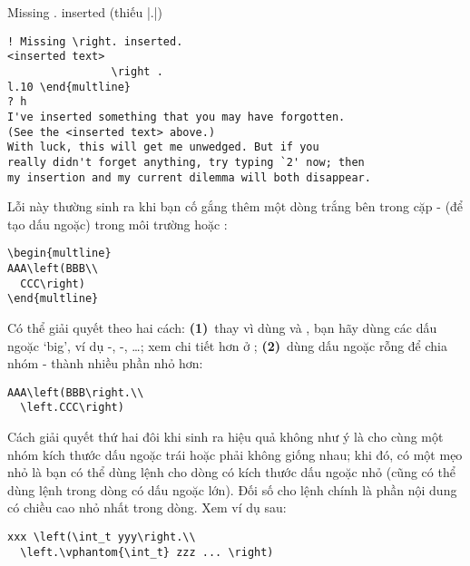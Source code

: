 \begin{error}{Missing \right. inserted}
(thiếu |\right.|)
\errexa
\begin{verbatim}
! Missing \right. inserted.
<inserted text>
                \right .
l.10 \end{multline}
? h
I've inserted something that you may have forgotten.
(See the <inserted text> above.)
With luck, this will get me unwedged. But if you
really didn't forget anything, try typing `2' now; then
my insertion and my current dilemma will both disappear.
\end{verbatim}
\errexpl
Lỗi này thường sinh ra khi bạn cố gắng thêm một dòng trắng bên trong
cặp - (để tạo dấu ngoặc) trong môi trường 
hoặc :
\begin{verbatim}
\begin{multline}
AAA\left(BBB\\
  CCC\right)
\end{multline}
\end{verbatim}
Có thể giải quyết theo hai cách: \textbf{(1)}~thay vì dùng  và ,
bạn hãy dùng các dấu ngoặc `big', ví dụ -,
-, \dots; xem chi tiết hơn ở ;
\textbf{(2)}~dùng dấu ngoặc rỗng để chia nhóm - thành
nhiều phần nhỏ hơn:
\begin{verbatim}
AAA\left(BBB\right.\\
  \left.CCC\right)
\end{verbatim}
Cách giải quyết thứ hai đôi khi sinh ra hiệu quả không như ý là cho cùng
một nhóm kích thước dấu ngoặc trái hoặc phải không giống nhau;
khi đó, có một  mẹo nhỏ là bạn có thể dùng lệnh  cho dòng
có kích thước dấu ngoặc nhỏ (cũng có thể dùng lệnh 
trong dòng có dấu  ngoặc lớn). Đối số cho lệnh  chính là
phần nội dung có chiều cao nhỏ nhất trong dòng. Xem ví dụ sau:
\begin{verbatim}
xxx \left(\int_t yyy\right.\\
  \left.\vphantom{\int_t} zzz ... \right)
\end{verbatim}
\end{error}

